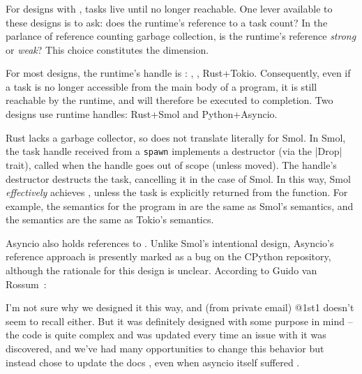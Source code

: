 \subsubsection{\References}\label{ssec:designdims:references}

For designs with \indef \extent, tasks live until no longer reachable. One lever available to these designs is to ask: does the runtime's reference to a task count? In the parlance of reference counting garbage collection, is the runtime's reference \emph{strong} or \emph{weak}? This choice constitutes the  dimension.


For most \indef \extent designs, the runtime's handle is \strong: \Js, \CSharp, Rust+Tokio. Consequently, even if a task is no longer accessible from the main body of a program, it is still reachable by the runtime, and will therefore be executed to completion. Two designs use \weak runtime handles: Rust+Smol and Python+Asyncio.

Rust lacks a garbage collector, so \weak {} does not translate literally for Smol. In Smol, the task handle received from a \lstinline[language=Pseudo]|spawn| implements a destructor (via the \code|Drop| trait), called when the handle goes out of scope (unless moved). The handle's destructor destructs the task, cancelling it in the case of Smol. In this way, Smol \emph{effectively} achieves \dyn \extent, unless the task is explicitly returned from the function. For example, the \dyn \extent semantics for the program in  are the same as Smol's semantics, and the \indef semantics are the same as Tokio's semantics.

Asyncio also holds \weak references to \tasks. Unlike Smol's intentional design, Asyncio's \weak reference approach is presently marked as a bug on the CPython repository, although the rationale for this design is unclear. According to Guido van Rossum~\cite{hartl_asyncio_2022}:

\begin{displayquote}
I'm not sure why we designed it this way, and (from private email) @1st1 doesn't seem to recall either. But it was definitely designed with some purpose in mind -- the code is quite complex and was updated every time an issue with it was discovered, and we've had many opportunities to change this behavior but instead chose to update the docs , even when asyncio itself suffered .~
\end{displayquote}
